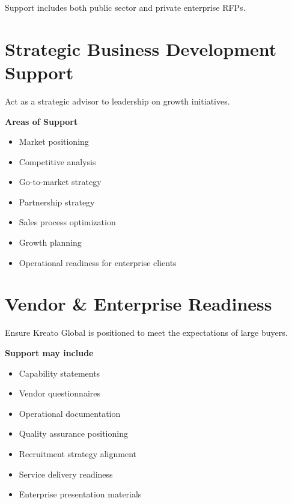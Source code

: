\documentclass{toospoint}
\begin{document}
Support includes both public sector and private enterprise RFPs.

\section{Strategic Business Development Support}

Act as a strategic advisor to leadership on growth initiatives.

\vspace{4pt}
\noindent\textbf{\color{TPDark}Areas of Support}
\begin{itemize}[leftmargin=1.5em, itemsep=2pt, topsep=2pt]
  \item Market positioning
  \item Competitive analysis
  \item Go-to-market strategy
  \item Partnership strategy
  \item Sales process optimization
  \item Growth planning
  \item Operational readiness for enterprise clients
\end{itemize}

\section{Vendor \& Enterprise Readiness}

Ensure Kreato Global is positioned to meet the expectations of large buyers.

\vspace{4pt}
\noindent\textbf{\color{TPDark}Support may include}
\begin{itemize}[leftmargin=1.5em, itemsep=2pt, topsep=2pt]
  \item Capability statements
  \item Vendor questionnaires
  \item Operational documentation
  \item Quality assurance positioning
  \item Recruitment strategy alignment
  \item Service delivery readiness
  \item Enterprise presentation materials
\end{itemize}
\end{document}
